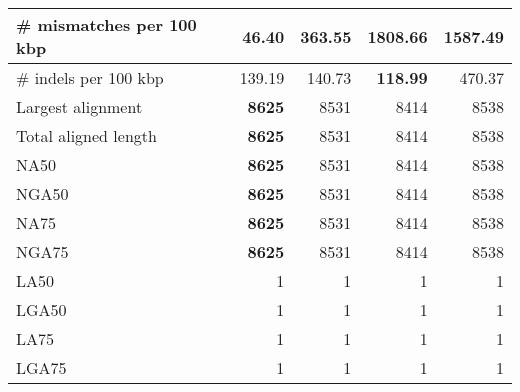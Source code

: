 \documentclass[12pt,a4paper]{article}
\begin{document}
\begin{table}[ht]
\begin{center}
\begin{tabular}{|l*{4}{|r}|}
\# mismatches per 100 kbp & {\bf 46.40} & 363.55 & 1808.66 & 1587.49 \\ \hline
\# indels per 100 kbp & 139.19 & 140.73 & {\bf 118.99} & 470.37 \\ \hline
Largest alignment & {\bf 8625} & 8531 & 8414 & 8538 \\ \hline
Total aligned length & {\bf 8625} & 8531 & 8414 & 8538 \\ \hline
NA50 & {\bf 8625} & 8531 & 8414 & 8538 \\ \hline
NGA50 & {\bf 8625} & 8531 & 8414 & 8538 \\ \hline
NA75 & {\bf 8625} & 8531 & 8414 & 8538 \\ \hline
NGA75 & {\bf 8625} & 8531 & 8414 & 8538 \\ \hline
LA50 & 1 & 1 & 1 & 1 \\ \hline
LGA50 & 1 & 1 & 1 & 1 \\ \hline
LA75 & 1 & 1 & 1 & 1 \\ \hline
LGA75 & 1 & 1 & 1 & 1 \\ \hline
\end{tabular}
\end{center}
\end{table}
\end{document}

